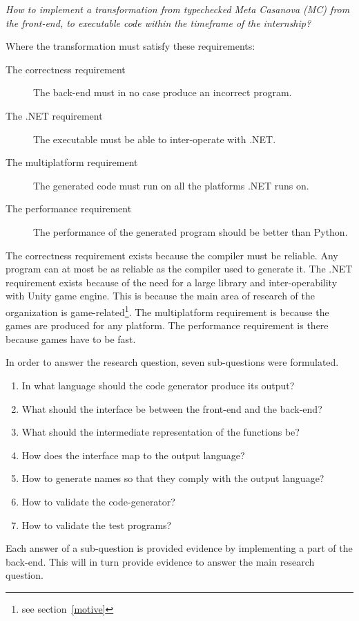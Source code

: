 \textit{How to implement a transformation from typechecked Meta Casanova (MC) from the front-end, to executable code within the timeframe of the internship?}

Where the transformation must satisfy these requirements:
\begin{description}
    \item[The correctness requirement] The back-end must in no case produce an incorrect program.
    \item[The .NET requirement] The executable must be able to inter-operate with .NET.
    \item[The multiplatform requirement] The generated code must run on all the platforms .NET runs on.
    \item[The performance requirement] The performance of the generated program should be better than Python.
\end{description}

The correctness requirement exists because the compiler must be reliable.
Any program can at most be as reliable as the compiler used to generate it.
\label{whydotnet}
The .NET requirement exists because of the need for a large library and inter-operability with Unity game engine.
This is because the main area of research of the organization is game-related\footnote{see section~\ref{motive}}.
The multiplatform requirement is because the games are produced for any platform.
The performance requirement is there because games have to be fast.

In order to answer the research question, seven sub-questions were formulated.

\begin{enumerate}
    \item In what language should the code generator produce its output?
    \item What should the interface be between the front-end and the back-end?
    \item What should the intermediate representation of the functions be?
    \item How does the interface map to the output language?
    \item How to generate names so that they comply with the output language?
    \item How to validate the code-generator?
    \item How to validate the test programs?
\end{enumerate}

Each answer of a sub-question is provided evidence by implementing a part of the back-end. 
This will in turn provide evidence to answer the main research question.

